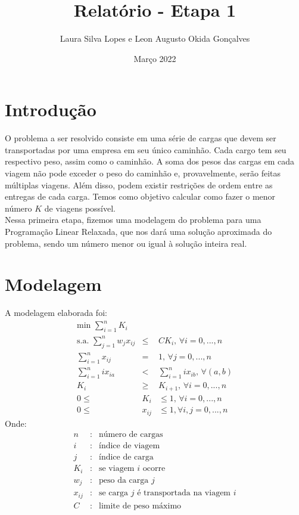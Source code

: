\documentclass{article}
\title{Relatório - Etapa 1}
\author{Laura Silva Lopes e Leon Augusto Okida Gonçalves}
\date{Março 2022}
\begin{document}
\maketitle

\section{Introdução}
O problema a ser resolvido consiste em uma série de cargas que devem ser transportadas por uma empresa em seu único caminhão. Cada cargo tem seu respectivo peso, assim como o caminhão. A soma dos pesos das cargas em cada viagem não pode exceder o peso do caminhão e, provavelmente, serão feitas múltiplas viagens. Além disso, podem existir restrições de ordem entre as entregas de cada carga. Temos como objetivo calcular como fazer o menor número $K$ de viagens possível.\\
Nessa primeira etapa, fizemos uma modelagem do problema para uma Programação Linear Relaxada, que nos dará uma solução aproximada do problema, sendo um número menor ou igual à solução inteira real.

\newpage
\section{Modelagem}
A modelagem elaborada foi:
\begin{eqnarray}
    \mbox{min } \sum_{i=1}^n K_i\\
    \mbox{s.a. }\sum_{j=1}^n w_j x_{ij} &\leq& C K_i \mbox{, } \forall i = 0, ..., n\\
    \sum_{i=1}^n x_{ij} &=& 1 \mbox{, } \forall j = 0, ..., n\\
    \sum_{i=1}^n i x_{ia} &<& \sum_{i=1}^n ix_{ib} \mbox{, } \forall (a, b)\\
    K_i &\geq& K_{i+1} \mbox{, } \forall i = 0, ..., n\\
    0 \leq &K_i& \leq 1 \mbox{, } \forall i = 0, ..., n\\
    0 \leq &x_{ij}& \leq 1, \forall i, j = 0, ..., n
\end{eqnarray}
Onde:
\begin{eqnarray*}
    n &:& \mbox{número de cargas}\\
    i &:& \mbox{índice de viagem}\\
    j &:& \mbox{índice de carga}\\
    K_i &:& \mbox{se viagem } i \mbox{ ocorre}\\
    w_j &:& \mbox{peso da carga } j\\
    x_{ij} &:& \mbox{se carga } j \mbox{ é transportada na viagem } i\\
    C &:& \mbox{limite de peso máximo}
\end{eqnarray*}
\end{document}
